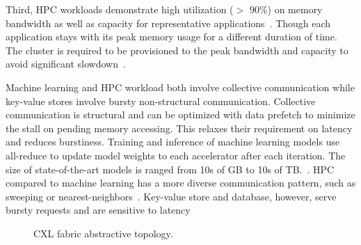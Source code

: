 Third, HPC workloads demonstrate high utilization ($>$ 90\%) on memory bandwidth as well as capacity for representative applications~\cite{doe-miniapps, crossroad-benchmarks, exascale-apps}. 
%
Though each application stays with its peak memory usage for a different duration of time.
%
The cluster is required to be provisioned to the peak bandwidth and capacity to avoid significant slowdown~\cite{hpc-memory-requirement:upc:2019, memory-trend:snl:2020, hpc-disagg-mem:arxiv:2023}.

Machine learning and HPC workload both involve collective communication while key-value stores involve bursty non-structural communication.
%
Collective communication is structural and can be optimized with data prefetch to minimize the stall on pending memory accessing.
%
This relaxes their requirement on latency and reduces burstiness.
%
Training and inference of machine learning models use all-reduce to update model weights to each accelerator after each iteration. The size of state-of-the-art models is ranged from 10s of GB to 10s of TB.~\cite{zero:arxiv:2020, zero-infinity:sc:2021, zionex:isca:2022}.
%
HPC compared to machine learning has a more diverse communication pattern, such as sweeping or nearest-neighbors~\cite{mpi-usage:sc:2019, ember-comm, exascale-apps, doe-miniapps}. 
%
Key-value store and database, however, serve bursty requests and are sensitive to latency~\cite{scale-memcache:nsdi:2013, rocksdb-modeling:fast:2020}

\begin{figure}[ht!]
    \begin{subfigure}[ht]{0.8\columnwidth}
    \end{subfigure}

    \begin{subfigure}[ht]{0.8\columnwidth}
    \end{subfigure}
\caption{CXL fabric abstractive topology.}
\label{fig:cxl-topo}
\end{figure}


